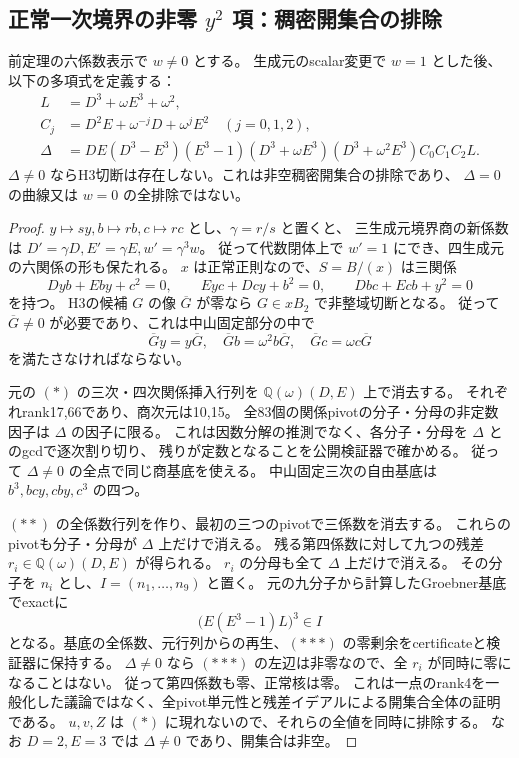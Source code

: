 \subsection{正常一次境界の非零 $y^2$ 項：稠密開集合の排除}
\label{subsec:cubic-third-root-unit-normal-boundary-open}
\begin{theorem}[正常一次境界商の開集合障害]
\label{thm:cubic-third-root-unit-normal-boundary-open}
前定理の六係数表示で $w\ne0$ とする。
生成元のscalar変更で $w=1$ とした後、以下の多項式を定義する：
\begin{align*}
 L&=D^3+\omega E^3+\omega^2,\\
 C_j&=D^2E+\omega^{-j}D+\omega^j E^2\quad(j=0,1,2),\\
 \Delta&=DE(D^3-E^3)(E^3-1)
 (D^3+\omega E^3)(D^3+\omega^2E^3)C_0C_1C_2L.
\end{align*}
$\Delta\ne0$ ならH3切断は存在しない。これは非空稠密開集合の排除であり、
$\Delta=0$ の曲線又は $w=0$ の全排除ではない。
\end{theorem}
\begin{proof}
$y\mapsto s y,b\mapsto r b,c\mapsto r c$ とし、$\gamma=r/s$ と置くと、
三生成元境界商の新係数は $D'=\gamma D,E'=\gamma E,w'=\gamma^3w$。
従って代数閉体上で $w'=1$ にでき、四生成元の六関係の形も保たれる。
$x$ は正常正則なので、$S=B/(x)$ は三関係
\[
 Dyb+Eby+c^2=0,\qquad Eyc+Dcy+b^2=0,\qquad
 Dbc+Ecb+y^2=0
\tag{*}
\]
を持つ。
H3の候補 $G$ の像 $\overline G$ が零なら $G\in xB_2$ で非整域切断となる。
従って $\overline G\ne0$ が必要であり、これは中山固定部分の中で
\[
 \overline Gy=y\overline G,\quad
 \overline Gb=\omega^2b\overline G,\quad
 \overline Gc=\omega c\overline G
\tag{**}
\]
を満たさなければならない。

元の $(*)$ の三次・四次関係挿入行列を
$\mathbb Q(\omega)(D,E)$ 上で消去する。
それぞれrank17,66であり、商次元は10,15。
全83個の関係pivotの分子・分母の非定数因子は $\Delta$ の因子に限る。
これは因数分解の推測でなく、各分子・分母を $\Delta$ とのgcdで逐次割り切り、
残りが定数となることを公開検証器で確かめる。
従って $\Delta\ne0$ の全点で同じ商基底を使える。
中山固定三次の自由基底は $b^3,bcy,cby,c^3$ の四つ。

$(**)$ の全係数行列を作り、最初の三つのpivotで三係数を消去する。
これらのpivotも分子・分母が $\Delta$ 上だけで消える。
残る第四係数に対して九つの残差 $r_i\in\mathbb Q(\omega)(D,E)$ が得られる。
$r_i$ の分母も全て $\Delta$ 上だけで消える。
その分子を $n_i$ とし、$I=(n_1,\ldots,n_9)$ と置く。
元の九分子から計算したGroebner基底でexactに
\[
 \bigl(E(E^3-1)L\bigr)^3\in I
\tag{***}
\]
となる。基底の全係数、元行列からの再生、$(***)$ の零剰余をcertificateと検証器に保持する。
$\Delta\ne0$ なら $(***)$ の左辺は非零なので、全 $r_i$ が同時に零になることはない。
従って第四係数も零、正常核は零。
これは一点のrank4を一般化した議論ではなく、全pivot単元性と残差イデアルによる開集合全体の証明である。
$u,v,Z$ は $(*)$ に現れないので、それらの全値を同時に排除する。
なお $D=2,E=3$ では $\Delta\ne0$ であり、開集合は非空。
\end{proof}
